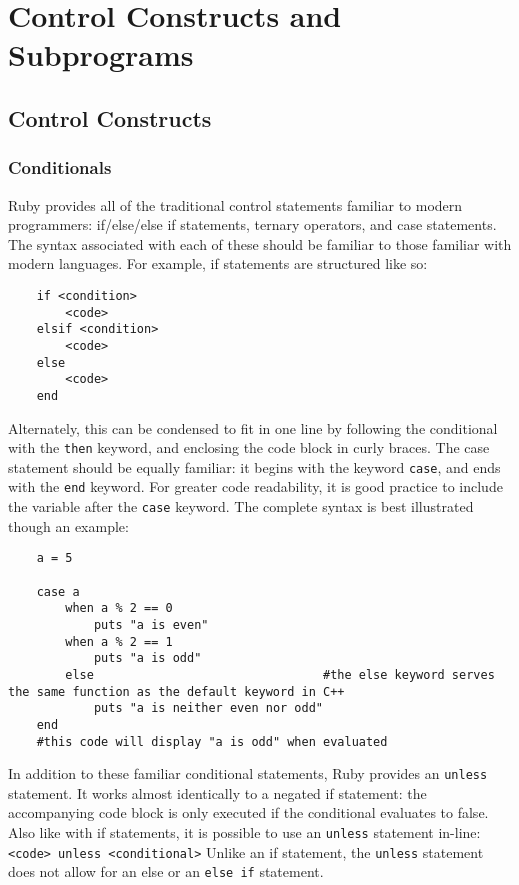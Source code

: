 \documentclass[12pt]{article}
\begin{document}

\pagebreak
\section{Control Constructs and Subprograms}
\subsection{Control Constructs}
\subsubsection{Conditionals}
Ruby provides all of the traditional control statements familiar to modern programmers: if/else/else if statements, ternary operators, and case statements. The syntax associated with each of these should be familiar to those familiar with modern languages. For example, if statements are structured like so:
\begin{lstlisting}
    if <condition>
        <code>
    elsif <condition>
        <code>
    else
        <code>
    end
\end{lstlisting}
Alternately, this can be condensed to fit in one line by following the conditional with the \verb|then| keyword, and enclosing the code block in curly braces\cite{flow_control}. The case statement should be equally familiar: it begins with the keyword \verb|case|, and ends with the \verb|end| keyword. For greater code readability, it is good practice to include the variable after the \verb|case| keyword. The complete syntax is best illustrated though an example:
\begin{lstlisting}
    a = 5
    
    case a
        when a % 2 == 0
            puts "a is even"
        when a % 2 == 1
            puts "a is odd"
        else                                #the else keyword serves the same function as the default keyword in C++
            puts "a is neither even nor odd"
    end
    #this code will display "a is odd" when evaluated
\end{lstlisting}
In addition to these familiar conditional statements, Ruby provides an \verb|unless| statement. It works almost identically to a negated if statement: the accompanying code block is only executed if the conditional evaluates to false\cite{ctrl_struct}. Also like with if statements, it is possible to use an \verb|unless| statement in-line: \verb|<code> unless <conditional>| Unlike an if statement, the \verb|unless| statement does not allow for an else or an \verb|else if| statement\cite{ctrl_struct}. 
\end{document}
